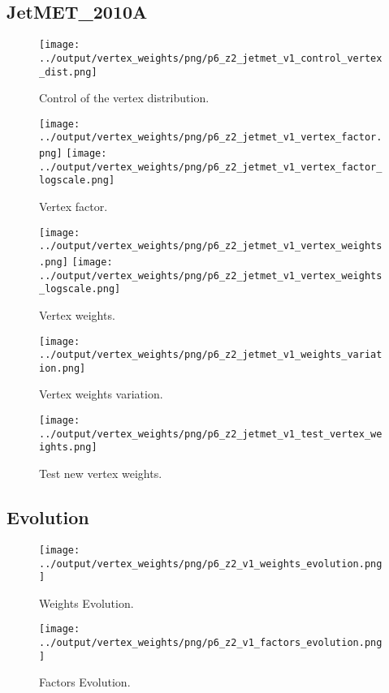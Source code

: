 \documentclass[11pt]{book}
\begin{document}
\subsection{JetMET\_2010A}
\begin{figure}[ht]
\centering
\texttt{[image: ../output/vertex\_weights/png/p6\_z2\_jetmet\_v1\_control\_vertex\_dist.png]}
\caption{Control of the vertex distribution.}
\end{figure}

\begin{figure}[ht]
\centering
\texttt{[image: ../output/vertex\_weights/png/p6\_z2\_jetmet\_v1\_vertex\_factor.png]}
\texttt{[image: ../output/vertex\_weights/png/p6\_z2\_jetmet\_v1\_vertex\_factor\_logscale.png]}
\caption{Vertex factor.}
\end{figure}

\begin{figure}[ht]
\centering
\texttt{[image: ../output/vertex\_weights/png/p6\_z2\_jetmet\_v1\_vertex\_weights.png]}
\texttt{[image: ../output/vertex\_weights/png/p6\_z2\_jetmet\_v1\_vertex\_weights\_logscale.png]}
\caption{Vertex weights.}
\end{figure}

\begin{figure}[ht]
\centering
\texttt{[image: ../output/vertex\_weights/png/p6\_z2\_jetmet\_v1\_weights\_variation.png]}
\caption{Vertex weights variation.}
\end{figure}

\begin{figure}[ht]
\centering
\texttt{[image: ../output/vertex\_weights/png/p6\_z2\_jetmet\_v1\_test\_vertex\_weights.png]}
\caption{Test new vertex weights.}
\end{figure}
\clearpage

\subsection{Evolution}
\begin{figure}[ht]
\centering
\texttt{[image: ../output/vertex\_weights/png/p6\_z2\_v1\_weights\_evolution.png]}
\caption{Weights Evolution.}
\end{figure}


\begin{figure}[ht]
\centering
\texttt{[image: ../output/vertex\_weights/png/p6\_z2\_v1\_factors\_evolution.png]}
\caption{Factors Evolution.}
\end{figure}
\end{document}
